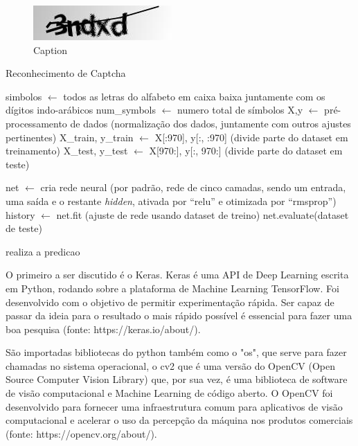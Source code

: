 \documentclass[twoside,conference,a4paper]{IEEEtran}
\begin{document}
\begin{figure}
    \centering
    \includegraphics{ModeloRelatorio/figuras/3ndxd.png}
    \caption{Caption}
    \label{fig:captcha_exemplo}
\end{figure}

\begin{algorithm}{}
\caption{Reconhecimento de Captcha}
\label{alg:captcha}
    \begin{algorithmic}[1]
    \State simbolos $\leftarrow$ todos as letras do alfabeto em caixa baixa juntamente com os dígitos indo-arábicos
    \STATE num\_symbols $\leftarrow$ numero total de símbolos
    \State X,y $\leftarrow$ pré-processamento de dados (normalização dos dados, juntamente com outros ajustes pertinentes)
    \State X\_train, y\_train $\leftarrow$ X[:970], y[:, :970] (divide parte do dataset em treinamento)
    \State X\_test, y\_test $\leftarrow$ X[970:], y[:, 970:] (divide parte do dataset em teste)
    
    \State net $\leftarrow$ cria rede neural (por padrão, rede de cinco camadas, sendo um entrada, uma saída e o restante \textit{hidden}, ativada por ``relu'' e otimizada por ``rmsprop'')
    \State history $\leftarrow$ net.fit (ajuste de rede usando dataset de treino)
    \State net.evaluate(dataset de teste)

        \State realiza a predicao
    \ENDWHILE
    \end{algorithmic}
\end{algorithm}

O primeiro a ser discutido é o Keras. Keras é uma API de Deep Learning escrita em Python, rodando sobre a plataforma de Machine Learning TensorFlow. Foi desenvolvido com o objetivo de permitir experimentação rápida. Ser capaz de passar da ideia para o resultado o mais rápido possível é essencial para fazer uma boa pesquisa (fonte: https://keras.io/about/).

São importadas bibliotecas do python também como o "os", que serve para fazer chamadas no sistema operacional, o cv2 que é uma versão do OpenCV (Open Source Computer Vision Library) que, por sua vez, é uma biblioteca de software de visão computacional e Machine Learning de código aberto. O OpenCV foi desenvolvido para fornecer uma infraestrutura comum para aplicativos de visão computacional e acelerar o uso da percepção da máquina nos produtos comerciais (fonte: https://opencv.org/about/). 
\end{document}
